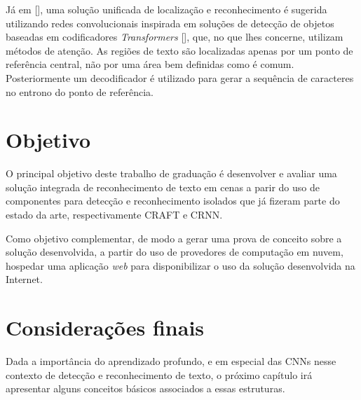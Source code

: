 Já em [], uma solução unificada de localização e reconhecimento é sugerida utilizando redes convolucionais inspirada em soluções de 
detecção de objetos baseadas em codificadores \textit{Transformers} [], que, no que lhes concerne, utilizam métodos de atenção. 
As regiões de texto são localizadas apenas por um ponto de referência central, não por uma área bem definidas como é comum. Posteriormente um decodificador 
é utilizado para gerar a sequência de caracteres no entrono do ponto de referência.

\section{Objetivo}

O principal objetivo deste trabalho de graduação é desenvolver e avaliar uma solução integrada de reconhecimento de texto em cenas a parir do uso de 
componentes para detecção e reconhecimento isolados que já fizeram parte do estado da arte, respectivamente CRAFT e CRNN.

Como objetivo complementar, de modo a gerar uma prova de conceito sobre a solução desenvolvida, a partir do uso de provedores de computação em nuvem, 
hospedar uma aplicação \textit{web} para disponibilizar o uso da solução desenvolvida na Internet.

\section{Considerações finais}
Dada a importância do aprendizado profundo, e em especial das CNNs nesse contexto de detecção e reconhecimento de texto, o próximo capítulo irá 
apresentar alguns conceitos básicos associados a essas estruturas.